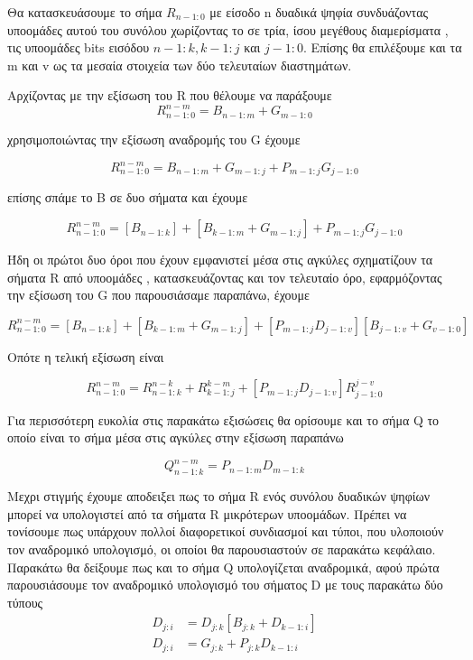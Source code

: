 Θα κατασκευάσουμε το σήμα $R_{n-1:0}$ με είσοδο n δυαδικά ψηφία συνδυάζοντας
υποομάδες αυτού του συνόλου χωρίζοντας το σε τρία, ίσου μεγέθους διαμερίσματα
, τις υποομάδες bits εισόδου $n-1:k , k-1:j$ και $j-1:0$. Επίσης θα επιλέξουμε
και τα m και v ως τα μεσαία στοιχεία των δύο τελευταίων διαστημάτων.
 

Αρχίζοντας με την εξίσωση του R που θέλουμε να παράξουμε 
\begin{equation*}
    R^{n-m}_{n-1:0} = B_{n-1:m} + G_{m-1:0}
\end{equation*}

χρησιμοποιώντας την εξίσωση αναδρομής του G έχουμε

\begin{equation*}
    R^{n-m}_{n-1:0} = B_{n-1:m} + G_{m-1:j} + P_{m-1:j}G_{j-1:0}
\end{equation*}

επίσης σπάμε το B σε δυο σήματα και έχουμε

\begin{equation*}
    R^{n-m}_{n-1:0} = [ B_{n-1:k} ] + [ B_{k-1:m} + G_{m-1:j} ] + P_{m-1:j}G_{j-1:0}
\end{equation*}

Ήδη οι πρώτοι δυο όροι που έχουν εμφανιστεί μέσα στις αγκύλες σχηματίζουν τα 
σήματα R από υποομάδες , κατασκευάζοντας και τον τελευταίο όρο, εφαρμόζοντας την
εξίσωση του G που παρουσιάσαμε παραπάνω, έχουμε

\begin{equation*}
    R^{n-m}_{n-1:0} = [ B_{n-1:k} ] + [ B_{k-1:m} + G_{m-1:j} ] + [ P_{m-1:j}D_{j-1:v} ][B_{j-1:v}+G_{v-1:0}]
\end{equation*}

Οπότε η τελική εξίσωση είναι 

\begin{equation}
    R^{n-m}_{n-1:0} = R^{n-k}_{n-1:k} + R^{k-m}_{k-1:j} + [ P_{m-1:j}D_{j-1:v} ]R^{j-v}_{j-1:0}
\end{equation}

Για περισσότερη ευκολία στις παρακάτω εξισώσεις θα ορίσουμε και το σήμα Q 
το οποίο είναι το σήμα μέσα στις αγκύλες στην εξίσωση παραπάνω 

\begin{equation}
    Q^{n-m}_{n-1:k} = P_{n-1:m}D_{m-1:k}
\end{equation}

Μεχρι στιγμής έχουμε αποδειξει πως το σήμα R ενός συνόλου δυαδικών ψηφίων
μπορεί να υπολογιστεί από τα σήματα R μικρότερων υποομάδων. Πρέπει
να τονίσουμε πως υπάρχουν πολλοί διαφορετικοί συνδιασμοί και τύποι, που υλοποιούν 
τον αναδρομικό υπολογισμό, οι οποίοι θα παρουσιαστούν σε παρακάτω κεφάλαιο. 
Παρακάτω θα δείξουμε πως και το σήμα Q υπολογίζεται αναδρομικά, αφού πρώτα παρουσιάσουμε τον 
αναδρομικό υπολογισμό του σήματος D με τους παρακάτω δύο τύπους 
\begin{equation}
\begin{split}
    D_{j:i} &= D_{j:k}[ B_{j:k} + D_{k-1:i} ] \\
    D_{j:i} &= G_{j:k} + P_{j:k}D_{k-1:i}
\end{split}
\end{equation}

